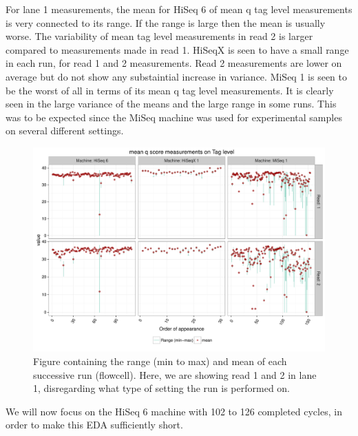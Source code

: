 \documentclass[a4paper,11pt,fleqn,twoside,notitlepage]{report}\usepackage[]{graphicx}\usepackage[]{color}
\makeatletter
\def\maxwidth{ %
  \ifdim\Gin@nat@width>\linewidth
    \linewidth
  \else
    \Gin@nat@width
  \fi
}
\newenvironment{knitrout}{}{} %
\makeatother
\begin{document}
For lane 1 measurements, the mean for HiSeq 6 of mean q tag level measurements is very connected to its range. If the range is large then the mean is usually worse. The variability of mean tag level measurements in read 2 is larger compared to measurements made in read 1. HiSeqX is seen to have a small range in each run, for read 1 and 2 measurements. Read 2 measurements are lower on average but do not show any substaintial increase in variance. MiSeq 1 is seen to be the worst of all in terms of its mean q tag level measurements. It is clearly seen in the large variance of the means and the large range in some runs. This was to be expected since the MiSeq machine was used for experimental samples on several different settings. 
\begin{knitrout}
\color{fgcolor}\begin{figure}[!htbp]
\includegraphics[width=\maxwidth]{figure/TagLevelTS-1} \caption[Figure containing the range (min to max) and mean of each successive run (flowcell)]{Figure containing the range (min to max) and mean of each successive run (flowcell). Here, we are showing read 1 and 2 in lane 1, disregarding what type of setting the run is performed on.}\label{fig:TagLevelTS}
\end{figure}


\end{knitrout}
We will now focus on the HiSeq 6 machine with 102 to 126 completed cycles, in order to make this EDA sufficiently short. 
\end{document}
